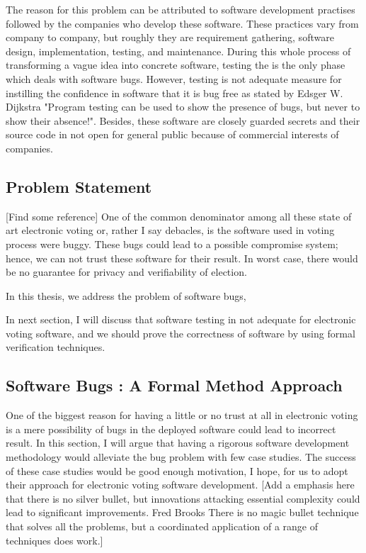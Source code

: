    The reason for 
   this problem can be attributed to software development practises 
   followed by the companies who develop these software. These practices 
   vary from company to company, but roughly they are requirement 
   gathering, software design, implementation, testing, and maintenance. 
   During this whole process of transforming a vague idea into 
   concrete software, testing the is the only phase which deals 
   with software bugs. However, testing is not adequate measure
   for instilling the confidence in software that it is bug free 
   as stated by 
    Edsger W. Dijkstra 
    "Program testing can be used to show the presence of bugs, 
    but never to show their absence!". Besides, these software 
    are closely guarded secrets and their source 
   code in not open for general public because of commercial 
   interests of companies.
   
   \subsection{Problem Statement}
   [Find some reference]
   One of the common denominator among all these state of art 
   electronic voting or, rather I say debacles, is 
   the software used in voting process were buggy. These bugs 
   could lead to a possible compromise system; hence, we can not 
   trust these software for their result. In worst case, 
   there would be no guarantee for privacy 
   and verifiability of election. 
   
   In this thesis, we address the problem of software bugs, 
   
   
   
  
   
   In next section, I will discuss that software testing 
   in not adequate for electronic voting software, and we should 
   prove the  correctness of software
   by using formal verification techniques. 
   
   
   \subsection{Software Bugs : A Formal Method Approach}

	
	
	One of the biggest reason for having a little or no trust at all 
	in electronic voting is a mere possibility of bugs in 
	the deployed software could lead to incorrect result.  
	In this section, I will argue that 
	having a rigorous software development methodology would alleviate 
	the bug problem with few case studies. The success of these 
	case studies would be good enough motivation, I hope, for us to 
	adopt their approach for electronic voting software development. 
    [Add a emphasis here that there is no silver bullet, but 
     innovations attacking essential complexity could lead to
     significant improvements. Fred Brooks 
     There  is  no magic bullet technique that solves all the 
     problems, but a coordinated  application  of  a  
     range  of  techniques  does work.] 	
	
